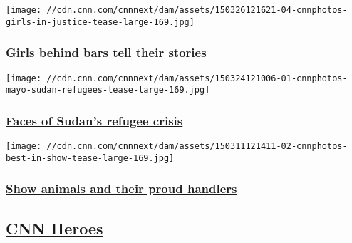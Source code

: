 \href{/2015/03/26/us/cnnphotos-girls-behind-bars/index.html}{}

\texttt{[image: //cdn.cnn.com/cnnnext/dam/assets/150326121621-04-cnnphotos-girls-in-justice-tease-large-169.jpg]}

\hypertarget{girls-behind-bars-tell-their-stories}{%
\subsubsection{\texorpdfstring{\href{/2015/03/26/us/cnnphotos-girls-behind-bars/index.html}{Girls
behind bars tell their
stories}}{Girls behind bars tell their stories}}\label{girls-behind-bars-tell-their-stories}}

\href{/2015/03/24/world/cnnphotos-sudan-refugees-portraits/index.html}{}

\texttt{[image: //cdn.cnn.com/cnnnext/dam/assets/150324121006-01-cnnphotos-mayo-sudan-refugees-tease-large-169.jpg]}

\hypertarget{faces-of-sudans-refugee-crisis}{%
\subsubsection{\texorpdfstring{\href{/2015/03/24/world/cnnphotos-sudan-refugees-portraits/index.html}{Faces
of Sudan's refugee
crisis}}{Faces of Sudan's refugee crisis}}\label{faces-of-sudans-refugee-crisis}}

\href{/2015/03/17/living/cnnphotos-british-show-animals/index.html}{}

\texttt{[image: //cdn.cnn.com/cnnnext/dam/assets/150311121411-02-cnnphotos-best-in-show-tease-large-169.jpg]}

\hypertarget{show-animals-and-their-proud-handlers}{%
\subsubsection{\texorpdfstring{\href{/2015/03/17/living/cnnphotos-british-show-animals/index.html}{Show
animals and their proud
handlers}}{Show animals and their proud handlers}}\label{show-animals-and-their-proud-handlers}}

\hypertarget{cnn-heroes-}{%
\subsection{\texorpdfstring{\href{http://edition.cnn.com/specials/cnn-heroes/}{CNN
Heroes}~}{CNN Heroes~}}\label{cnn-heroes-}}

